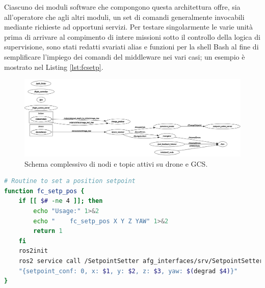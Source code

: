 Ciascuno dei moduli software che compongono questa architettura offre, sia all'operatore che agli altri moduli, un set di comandi generalmente invocabili mediante richieste ad opportuni servizi. Per testare singolarmente le varie unità prima di arrivare al compimento di intere missioni sotto il controllo della logica di supervisione, sono stati redatti svariati alias e funzioni per la shell Bash al fine di semplificare l'impiego dei comandi del middleware nei vari casi; un esempio è mostrato nel Listing \ref{lst:fcsetp}.
\newpage

\begin{figure}
    \centering
    \includegraphics[width=\textwidth]{figs/chapter3/nodesgraph.png}
    \caption{Schema complessivo di nodi e topic attivi su drone e GCS.}
    \label{fig:nodesgraph}
\end{figure}

\begin{lstlisting}[language=bash, caption={Esempio di funzione Bash per cambiare setpoint di posizione corrente.}, label={lst:fcsetp}]
# Routine to set a position setpoint
function fc_setp_pos {
    if [[ $# -ne 4 ]]; then
        echo "Usage:" 1>&2
        echo "    fc_setp_pos X Y Z YAW" 1>&2
        return 1
    fi
    ros2init
    ros2 service call /SetpointSetter afg_interfaces/srv/SetpointSetter\
    "{setpoint_conf: 0, x: $1, y: $2, z: $3, yaw: $(degrad $4)}"
}
\end{lstlisting}

